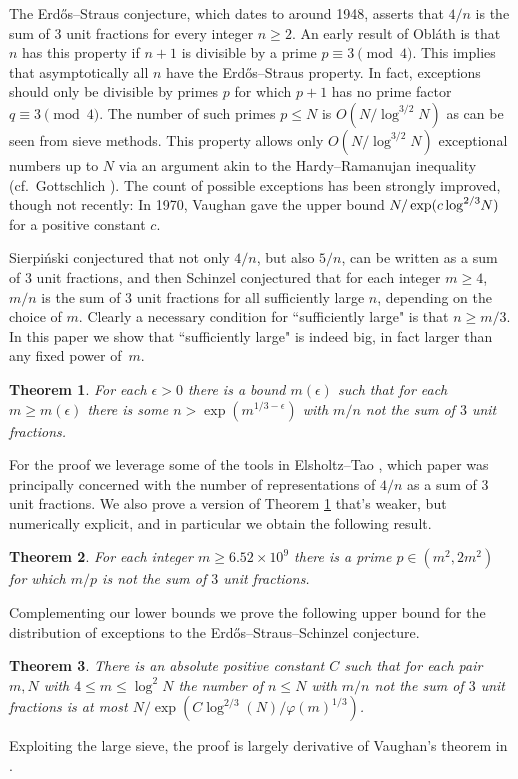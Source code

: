 \documentclass[12pt]{amsart}
\newtheorem{theorem}{Theorem}[section]
\theoremstyle{definition}
\theoremstyle{remark}
\numberwithin{equation}{section}
\begin{document}
The Erd\H os--Straus conjecture, which dates to around 1948, asserts that $4/n$ is the sum of 3 unit fractions
for every integer
$n\ge 2$.  An early result of Obl\'ath \cite{O} is 
that $n$ has this property if $n+1$ is divisible by a prime $p\equiv3\pmod 4$.  This
implies that asymptotically all $n$ have the Erd\H os--Straus property.  In fact, exceptions
should only be divisible by primes $p$ for which $p+1$ has no prime factor $q\equiv3\pmod4$.
The number of such primes $p\le N$ is $O(N/\log^{3/2}N)$ as can be seen from sieve methods.
This property allows only $O(N/\log^{3/2} N)$ exceptional numbers up to $N$ via an argument akin to
the Hardy--Ramanujan inequality (cf.~Gottschlich \cite[Lemma 2.3]{G}).  The count of possible
exceptions has been strongly improved, though not recently: In 1970, Vaughan \cite{V} gave
 the upper bound $N/\exp(c\log^{2/3}\kern-2pt N)$ for a positive constant $c$.
 
 Sierpi\'nski conjectured that not only $4/n$, but also $5/n$, can be written as a sum
 of 3 unit fractions, and then Schinzel conjectured that for each integer $m\ge4$,
 $m/n$ is the sum of 3 unit fractions for all sufficiently large $n$, depending on the
 choice of $m$.  Clearly a necessary condition for ``sufficiently large" is that $n\ge m/3$.
 In this paper we show that ``sufficiently large" is indeed big, in fact larger than any
 fixed power of~$m$.
 
 \begin{theorem}
 \label{th-mbound}
 For each $\epsilon>0$ there is a bound $m(\epsilon)$ such that  for each $m\ge m(\epsilon)$
 there is some $n>\exp(m^{1/3-\epsilon})$ with $m/n$ not the sum of $3$ unit fractions.
 \end{theorem}
 For the proof we leverage some of the tools in Elsholtz--Tao \cite{ET}, which paper was
 principally concerned with the number of representations of $4/n$ as a sum of 3 unit
 fractions.  We also prove a version of Theorem \ref{th-mbound} that's weaker, but
 numerically explicit, and in particular we obtain the following result.
 \begin{theorem}
\label{th-explicit}
For each integer $m\ge 6.52\times10^9$ there is a prime $p\in(m^2,2m^2)$ for which
$m/p$ is not the sum of $3$ unit fractions.
\end{theorem}
  
Complementing our lower bounds we prove the following upper bound for the 
distribution of exceptions to the Erd\H os--Straus--Schinzel conjecture.
\begin{theorem}
\label{th-v}
There is an absolute positive constant $C$ such that for each pair $m,N$ with 
$4\le m \le \log^2 N$ the number of $n\le N$ with $m/n$ not the sum of $3$
unit fractions is at most $N/\exp(C\log^{2/3}(N)/\varphi(m)^{1/3})$.
\end{theorem}
Exploiting the large sieve, the proof is largely derivative of Vaughan's theorem in \cite{V}.
\end{document}
